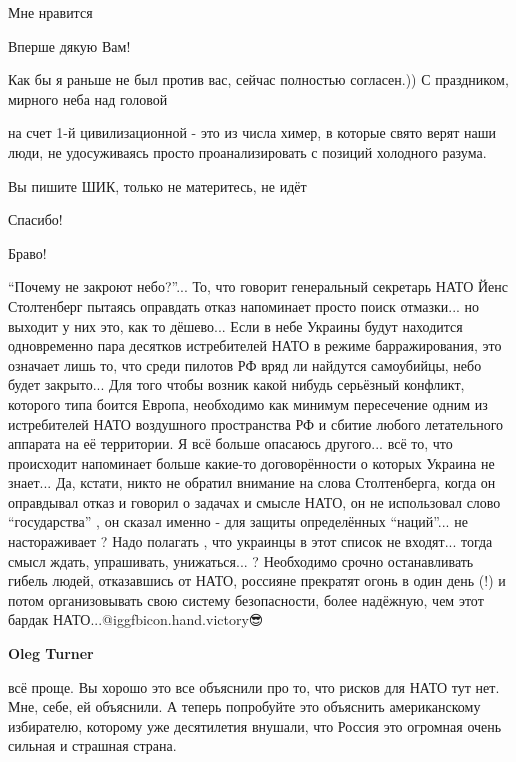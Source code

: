 \begin{itemize}
Мне нравится

Вперше дякую Вам!

Как бы я раньше не был против вас, сейчас полностью согласен.)) С праздником, мирного неба над головой


на счет 1-й цивилизационной - это из числа химер, в которые свято верят наши
люди, не удосуживаясь просто проанализировать с позиций холодного разума.


Вы пишите ШИК, только не материтесь, не идёт

Спасибо!

Браво!


\enquote{Почему не закроют небо?}... То, что говорит генеральный секретарь НАТО Йенс
Столтенберг пытаясь оправдать отказ напоминает просто поиск отмазки... но
выходит у них это, как то дёшево... Если в небе Украины будут находится
одновременно пара десятков истребителей НАТО в режиме барражирования, это
означает лишь то, что среди пилотов РФ вряд ли найдутся самоубийцы, небо будет
закрыто... Для того чтобы возник какой нибудь серьёзный конфликт, которого типа
боится Европа, необходимо как минимум пересечение одним из истребителей НАТО
воздушного пространства РФ и сбитие любого летательного аппарата на её
территории. Я всё больше опасаюсь другого... всё то, что происходит напоминает
больше какие-то договорённости о которых Украина не знает... Да, кстати, никто
не обратил внимание на слова Столтенберга, когда он оправдывал отказ и говорил
о задачах и смысле НАТО, он не использовал слово \enquote{государства} , он сказал
именно - для защиты определённых \enquote{наций}... не настораживает ? Надо полагать ,
что украинцы в этот список не входят... тогда смысл ждать, упрашивать,
унижаться... ? Необходимо срочно останавливать гибель людей, отказавшись от
НАТО, россияне прекратят огонь в один день (!) и потом организовывать свою
систему безопасности, более надёжную, чем этот бардак НАТО...@igg{fbicon.hand.victory}😎

\begin{itemize} %
\textbf{Oleg Turner} 

всё проще. Вы хорошо это все объяснили про то, что рисков для НАТО тут нет.
Мне, себе, ей объяснили. А теперь попробуйте это объяснить американскому
избирателю, которому уже десятилетия внушали, что Россия это огромная очень
сильная и страшная страна.


\end{itemize}
\end{itemize}
